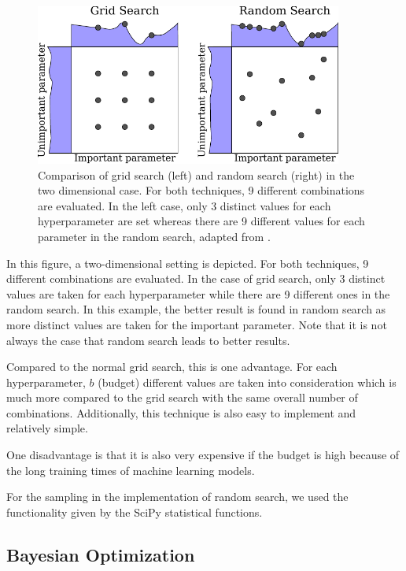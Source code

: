 \begin{figure}[H]
	\centering
	\includegraphics[width=0.9\textwidth]{figures/Fig_2_3_grid_random_search}
	\caption{Comparison of grid search (left) and random search (right) in the two dimensional case. For both techniques, 9 different combinations are evaluated. In the left case, only 3 distinct values for each hyperparameter are set whereas there are 9 different values for each parameter in the random search, adapted from \cite{feurer2019hyperparameter}. }
	\label{fig:comparison_searches}
\end{figure}

In this figure, a two-dimensional setting is depicted. For both techniques, 9 different combinations are evaluated. In the case of grid search, only 3 distinct values are taken for each hyperparameter while there are 9 different ones in the random search. In this example, the better result is found in random search as more distinct values are taken for the important parameter. Note that it is not always the case that random search leads to better results.

Compared to the normal grid search, this is one advantage. For each hyperparameter, $ b $ (budget) different values are taken into consideration which is much more compared to the grid search with the same overall number of combinations. Additionally, this technique is also easy to implement and relatively simple. 

One disadvantage is that it is also very expensive if the budget is high because of the long training times of machine learning models. 

For the sampling in the implementation of random search, we used the functionality given by the SciPy \cite{2020SciPy-NMeth} statistical functions.


\subsection{Bayesian Optimization}

